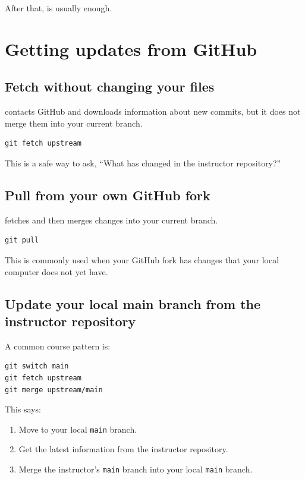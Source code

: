 \documentclass[11pt]{article}
\newcommand{\main}{\texttt{main}}
\begin{document}
After that,  is usually enough.

\section{Getting updates from GitHub}

\subsection{Fetch without changing your files}
 contacts GitHub and downloads information about new commits, but it does not merge them into your current branch.

\begin{lstlisting}[style=terminal]
git fetch upstream
\end{lstlisting}

This is a safe way to ask, ``What has changed in the instructor repository?''

\subsection{Pull from your own GitHub fork}
 fetches and then merges changes into your current branch.

\begin{lstlisting}[style=terminal]
git pull
\end{lstlisting}

This is commonly used when your GitHub fork has changes that your local computer does not yet have.

\subsection{Update your local main branch from the instructor repository}
A common course pattern is:

\begin{lstlisting}[style=terminal]
git switch main
git fetch upstream
git merge upstream/main
\end{lstlisting}

This says:

\begin{enumerate}[itemsep=2pt]
  \item Move to your local \main{} branch.
  \item Get the latest information from the instructor repository.
  \item Merge the instructor's \main{} branch into your local \main{} branch.
\end{enumerate}
\end{document}
